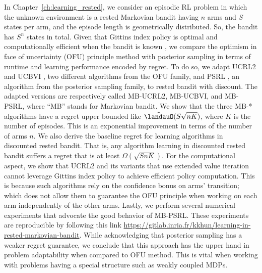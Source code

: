 In Chapter~\ref{ch:learning_rested}, we consider an episodic RL problem in which the unknown environment is a rested Markovian bandit having $n$ arms and $S$ states per arm, and the episode length is geometrically distributed.
So, the bandit has $S^n$ states in total.
Given that Gittins index policy is optimal and computationally efficient when the bandit is known \cite{gittins1979bandit}, we compare the optimism in face of uncertainty (OFU) principle method with posterior sampling in terms of runtime and learning performance encoded by regret.
To do so, we adapt UCRL2 \cite{jaksch2010near} and UCBVI \cite{azar2017minimax}, two different algorithms from the OFU family, and PSRL \cite{osband2013more}, an algorithm from the posterior sampling family, to rested bandit with discount.
The adapted versions are respectively called MB-UCRL2, MB-UCBVI, and MB-PSRL, where ``MB'' stands for Markovian bandit.
We show that the three MB-* algorithms have a regret upper bounded like $\tilde{\landauO}(S\sqrt{nK})$, where $K$ is the number of episodes.
This is an exponential improvement in terms of the number of arms $n$.
We also derive the baseline regret for learning algorithms in discounted rested bandit.
That is, any algorithm learning in discounted rested bandit suffers a regret that is at least $\Omega(\sqrt{SnK})$.
For the computational aspect, we show that UCRL2 and its variants that use extended value iteration \cite{jaksch2010near} cannot leverage Gittins index policy to achieve efficient policy computation.
This is because such algorithms rely on the confidence bonus on arms' transition; which does not allow them to guarantee the OFU principle when working on each arm independently of the other arms.
Lastly, we perform several numerical experiments that advocate the good behavior of MB-PSRL.
These experiments are reproducible by following this link \url{https://gitlab.inria.fr/kkhun/learning-in-rested-markovian-bandit}.
While acknowledging that posterior sampling has a weaker regret guarantee, we conclude that this approach has the upper hand in problem adaptability when compared to OFU method.
This is vital when working with problems having a special structure such as weakly coupled MDPs.

